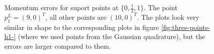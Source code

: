 \begin{figure}[h!]
\caption{Momentum errors for suport points at $\{0, \frac{1}{2}, 1\}$. The point $p_1^L=(9,0)^T$, all other points are $(10,0)^T$. The plots look very similar in shape to the corresponding plots in figure \ref{fig:three-points-h1-} (where we used points from the Gaussian quadrature), but the errors are larger compared to them.}
\label{fig:equidist_3_alles_default_ausser_p1_9_0}
\end{figure}

